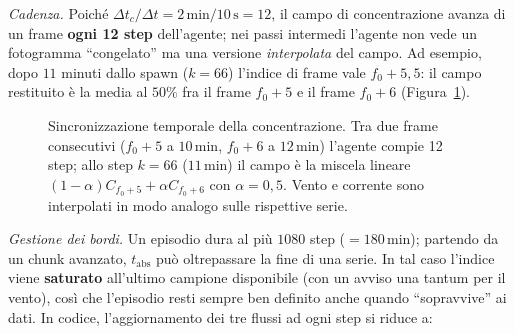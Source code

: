 \medskip\noindent\emph{Cadenza.} Poich\'e
$\Delta t_c / \Delta t = 2\,\text{min} / 10\,\text{s} = 12$, il campo di concentrazione
avanza di un frame \textbf{ogni 12 step} dell'agente; nei passi intermedi l'agente non vede
un fotogramma ``congelato'' ma una versione \emph{interpolata} del campo. Ad esempio, dopo
$11$ minuti dallo spawn ($k = 66$) l'indice di frame vale $f_0 + 5{,}5$: il campo restituito
\`e la media al $50\%$ fra il frame $f_0{+}5$ e il frame $f_0{+}6$
(Figura~\ref{fig:timeline}).

\begin{figure}[H]
\centering
{}
\caption{Sincronizzazione temporale della concentrazione. Tra due frame consecutivi
         ($f_0{+}5$ a $10\,\text{min}$, $f_0{+}6$ a $12\,\text{min}$) l'agente compie 12 step;
         allo step $k{=}66$ ($11\,\text{min}$) il campo \`e la miscela lineare
         $(1-\alpha)C_{f_0+5} + \alpha C_{f_0+6}$ con $\alpha = 0{,}5$. Vento e corrente sono
         interpolati in modo analogo sulle rispettive serie.}
\label{fig:timeline}
\end{figure}

\medskip\noindent\emph{Gestione dei bordi.} Un episodio dura al pi\`u $1080$ step
($= 180\,\text{min}$); partendo da un chunk avanzato, $t_{\text{abs}}$ pu\`o oltrepassare la
fine di una serie. In tal caso l'indice viene \textbf{saturato} all'ultimo campione
disponibile (con un avviso una tantum per il vento), cos\`i che l'episodio resti sempre ben
definito anche quando ``sopravvive'' ai dati. In codice, l'aggiornamento dei tre flussi ad
ogni step si riduce a:

